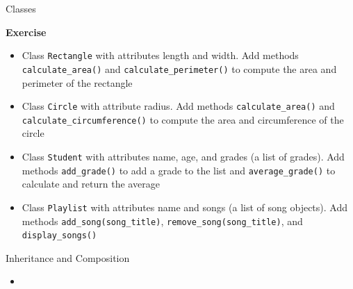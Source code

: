 \documentclass[
	11pt, 
]{beamer}
\begin{document}

\begin{frame}[fragile]{Classes}

\begin{alertblock}{\textbf{Exercise}}
\begin{itemize}
    \item Class \texttt{Rectangle} with attributes length and width. Add methods \texttt{calculate\_area()} and \texttt{calculate\_perimeter()} to compute the area and perimeter of the rectangle
    \vspace{.1cm}

    \item Class \texttt{Circle} with attribute radius. Add methods \texttt{calculate\_area()} and \texttt{calculate\_circumference()} to compute the area and circumference of the circle
    \vspace{.1cm}

    \item Class \texttt{Student} with attributes name, age, and grades (a list of grades). Add methods \texttt{add\_grade()} to add a grade to the list and \texttt{average\_grade()} to calculate and return the average
    \vspace{.1cm}

    \item Class \texttt{Playlist}  with attributes name and songs (a list of song objects). Add methods \texttt{add\_song(song\_title)}, \texttt{remove\_song(song\_title)}, and \texttt{display\_songs()}
\end{itemize}

\end{alertblock}

\end{frame}


\begin{frame}[fragile]{Inheritance and Composition}

\begin{itemize}
    \item 
\end{itemize}

\end{frame}

\end{document}
